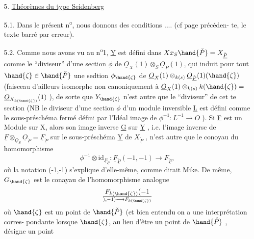 
5. \uline{Th\'eor\`emes du type Seidenberg}

5.1.
Dans le pr\'esent n\textsuperscript{o}, nous donnons des conditions .... (cf page pr\'ec\'eden-%
te, le texte barr\'e par erreur).

5.2. Comme nous avons vu au n\textsuperscript{o}1, \underline{Y} est d\'efini dans $X x_S \hand{\check{P}} = X_{\check{\underline{P}}}$
comme le ``diviseur'' d'une section $\phi$ de $\underline{O}_X(1)\otimes_S \underline{O}_{\check{\underline{P}}}(1)$, qui induit pour
tout $\hand{\zeta} \in \hand{\check{P}}$ une sedtion $\phi_{\hand{\zeta}}$ de  $\underline{O}_X(1)\otimes_{k(s)}\underline{O}_{\check{\underline{P}}}(1)(\hand{\zeta})$
(faisceau d'ailleurs isomorphe non canoniquement \`a $\underline{O}_X(1)\otimes_{k(s)}k(\hand{\zeta}) =$
$\underline{O}_{X_{k(\hand{\zeta})}}(1)$ ), de sorte que $Y_{\hand{\zeta}}$ n'est autre que le  ``diviseur'' de cet
te section (NB le diviseur d'une section $\phi$ d'un module inversible \underline{L} \margin{$/\!/$}
est d\'efini comme le sous-pr\'esch\'ema ferm\'e d\'efini par l'Id\'eal image de
$\phi^{-1} : \underline{L}^{-1} \longrightarrow \underline{O}$ ). Si \underline{F} est un Module sur X, alors son image inverse \underline{G}
sur \underline{Y} , i.e. l'image inverse de $\underline{F}\otimes_{\underline{O}_S}\underline{O}_{\check{\underline{P}}} = \underline{F}_{\check{\underline{P}}}$ sur le sous-pr\'esch\'ema \underline{Y} de
$X_{\check{\underline{P}}}$ , n'est autre que le conoyau du homomorphisme
\[ \phi^{-1}\otimes \mathrm{id}_{\underline{F}_{\check{\underline{P}}}} : \underline{F}_{\check{\underline{P}}}(-1,-1) \longrightarrow F_{\check{\underline{P}}} , \]
o\`u la notation (-1,-1) s'explique d'elle-m\^eme, comme dirait Mike. De
m\^eme, $G_{\hand{\zeta}}$ est le conayau de l'homomorphisme analogue
\[ F_{k(\hand{\zeta})}(-1\over{)}{,}-1) \longrightarrow F_{k(\hand{\zeta})} \]
o\`u $\hand{\zeta}$ est un point de $\hand{\check{P}}$ (et bien entendu on a une interpr\'etation corres-%
pondante lorsque $\hand{\zeta}$, au lieu d'\^etre un point de $\hand{\check{P}}$ , d\'esigne un point
